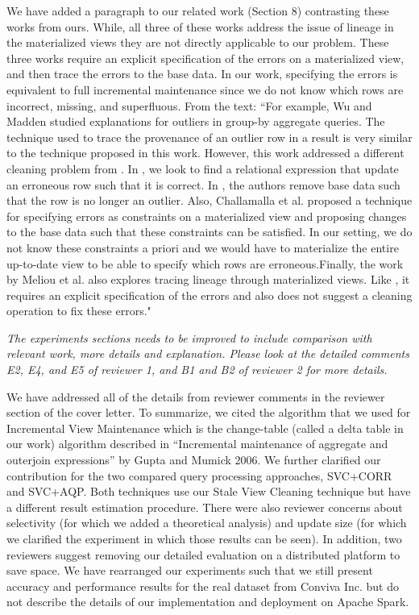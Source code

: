We have added a paragraph to our related work (Section 8) contrasting these works from ours. While, all three of these works address the issue of lineage in the materialized views they are not directly applicable to our problem. These three works require an explicit specification of the errors on a materialized view, and then trace the errors to the base data. In our work, specifying the errors is equivalent to full incremental maintenance since we do not know which rows are incorrect, missing, and superfluous. From the text:
``For example, Wu and Madden \cite{DBLP:journals/pvldb/0002M13} studied explanations for outliers in group-by aggregate queries. The technique used to trace the provenance of an outlier row in a result is very similar to the technique proposed in this work. However, this work addressed a different cleaning problem from \svc. In \svc, we look to find a relational expression that update an erroneous row such that it is correct. In \cite{DBLP:journals/pvldb/0002M13}, the authors remove base data such that the row is no longer an outlier. Also, Challamalla et al. \cite{DBLP:conf/sigmod/ChalamallaIOP14} proposed a technique for specifying errors as constraints on a materialized view and proposing changes to the base data such that these constraints can be satisfied.
In our setting, we do not know these constraints a priori and we would have to materialize the entire up-to-date view to be able to specify which rows are erroneous.Finally, the work by Meliou et al. \cite{DBLP:conf/sigmod/MeliouGNS11} also explores tracing lineage through materialized views. Like \cite{DBLP:journals/pvldb/0002M13}, it requires an explicit specification of the errors and also does not suggest a cleaning operation to fix these errors."

\vspace{1em}
\emph{The experiments sections needs to be improved to include comparison with relevant work, more details and explanation. Please look at the detailed comments E2, E4, and E5 of reviewer 1, and B1 and B2 of reviewer 2 for more details. }

We have addressed all of the details from reviewer comments in the reviewer section of the cover letter. To summarize, we cited the algorithm that we used for Incremental View Maintenance which is the change-table (called a delta table in our work) algorithm described in “Incremental maintenance of aggregate and outerjoin expressions” by Gupta and Mumick 2006. We further clarified our contribution for the two compared query processing approaches, SVC+CORR and SVC+AQP. Both techniques use our Stale View Cleaning technique but have a different result estimation procedure. There were also reviewer concerns about selectivity (for which we added a theoretical analysis) and update size (for which we clarified the experiment in which those results can be seen).
In addition, two reviewers suggest removing our detailed evaluation on a distributed platform to save space. We have rearranged our experiments such that we still present accuracy and performance results for the real dataset from Conviva Inc. but do not describe the details of our implementation and deployment on Apache Spark.

